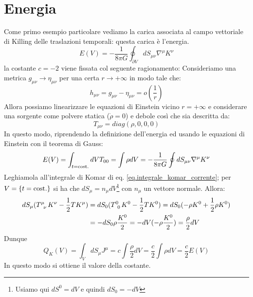 \section{Energia}
Come primo esempio particolare vediamo la carica associata al campo vettoriale di Killing delle traslazioni temporali: questa carica è l'energia.
\begin{equation}
    E(V) = - \frac{1}{8\pi G}\oint_{\partial V} dS_{\mu\nu}\nabla^\mu K^\nu 
    \label{eq.komar_energia}
\end{equation}
la costante $c = -2$ viene fissata col seguente ragionamento:
Consideriamo una metrica $g_{\mu\nu} \rightarrow \eta_{\mu\nu}$ per una certa $r\rightarrow +\infty$ in modo tale che:
 \begin{equation*}
     h_{\mu\nu} = g_{\mu\nu} - \eta_{\mu\nu} = o(\frac{1}{r})
 \end{equation*}
Allora possiamo linearizzare le equazioni di Einstein vicino $r = + \infty$ e considerare una sorgente come polvere statica ($\dot\rho = 0$) e debole così che sia descritta da:
 \begin{equation*}
     T_{\mu\nu} = diag (\rho, 0,0,0)
 \end{equation*}
In questo modo, riprendendo la definizione dell'energia ed usando le equazioni di Einstein con il teorema di Gauss:
 \begin{equation*}
     E(V) = \int_{t=\textrm{cost.}} dV T_{00} = \int \rho dV = -\frac{1}{8\pi G}\oint dS_{\mu\nu}\nabla^\mu K^\nu
 \end{equation*}
Leghiamola all'integrale di Komar di eq. \ref{eq.integrale_komar_corrente}; per $V =\{ t= \textrm{cost.}\}$ si ha che $dS_\mu = n_\mu dV$\footnote{Usiamo qui $dS^0 = dV$ e quindi $dS_0 = -dV$} con $n_\mu$ un vettore normale. Allora:
 \begin{align*}
     dS_\mu(\tensor{T}{^\mu_\nu}K^\nu - \frac{1}{2}TK^\mu) &= dS_0( \tensor{T}{^0_0}K^0 - \frac{1}{2}TK^0) = dS_0(-\rho K^0 + \frac{1}{2}\rho K^0) \\
     &= - dS_0 \rho \frac{K^0}{2} = -dV (-\rho\frac{K^0}{2})= \frac{\rho}{2}dV
 \end{align*}
 Dunque
 \begin{equation*}
     Q_K(V) = \int_V dS_\mu J^\mu = c \int \frac{\rho}{2}dV = \frac{c}{2}\int \rho dV = \frac{c}{2}E(V)
 \end{equation*}
 In questo modo si ottiene il valore della costante.

